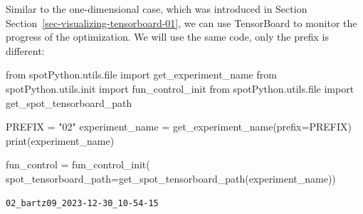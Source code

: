\documentclass[
  letterpaper,
  DIV=11,
  numbers=noendperiod]{scrreprt}
\newenvironment{Shaded}{\begin{snugshade}}{\end{snugshade}}
\newcommand{\BuiltInTok}[1]{\textcolor[rgb]{0.00,0.23,0.31}{#1}}
\newcommand{\ImportTok}[1]{\textcolor[rgb]{0.00,0.46,0.62}{#1}}
\newcommand{\NormalTok}[1]{\textcolor[rgb]{0.00,0.23,0.31}{#1}}
\newcommand{\OperatorTok}[1]{\textcolor[rgb]{0.37,0.37,0.37}{#1}}
\newcommand{\StringTok}[1]{\textcolor[rgb]{0.13,0.47,0.30}{#1}}
\begin{document}
\begin{tcolorbox}[enhanced jigsaw, arc=.35mm, colback=white, bottomtitle=1mm, toprule=.15mm, coltitle=black, titlerule=0mm, leftrule=.75mm, title=\textcolor{quarto-callout-note-color}{\faInfo}\hspace{0.5em}{TensorBoard}, opacitybacktitle=0.6, breakable, colbacktitle=quarto-callout-note-color!10!white, opacityback=0, toptitle=1mm, rightrule=.15mm, left=2mm, colframe=quarto-callout-note-color-frame, bottomrule=.15mm]

Similar to the one-dimensional case, which was introduced in Section
Section~\ref{sec-visualizing-tensorboard-01}, we can use TensorBoard to
monitor the progress of the optimization. We will use the same code,
only the prefix is different:

\begin{Shaded}
\begin{Highlighting}[]
\ImportTok{from}\NormalTok{ spotPython.utils.}\BuiltInTok{file} \ImportTok{import}\NormalTok{ get\_experiment\_name}
\ImportTok{from}\NormalTok{ spotPython.utils.init }\ImportTok{import}\NormalTok{ fun\_control\_init}
\ImportTok{from}\NormalTok{ spotPython.utils.}\BuiltInTok{file} \ImportTok{import}\NormalTok{ get\_spot\_tensorboard\_path}

\NormalTok{PREFIX }\OperatorTok{=} \StringTok{"02"}
\NormalTok{experiment\_name }\OperatorTok{=}\NormalTok{ get\_experiment\_name(prefix}\OperatorTok{=}\NormalTok{PREFIX)}
\BuiltInTok{print}\NormalTok{(experiment\_name)}

\NormalTok{fun\_control }\OperatorTok{=}\NormalTok{ fun\_control\_init(}
\NormalTok{    spot\_tensorboard\_path}\OperatorTok{=}\NormalTok{get\_spot\_tensorboard\_path(experiment\_name))}
\end{Highlighting}
\end{Shaded}

\begin{verbatim}
02_bartz09_2023-12-30_10-54-15
\end{verbatim}

\end{tcolorbox}
\end{document}
